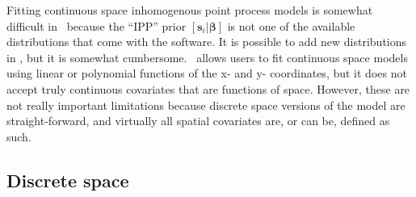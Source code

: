 Fitting continuous space inhomogenous point process models is somewhat
difficult in \bugs~because the ``IPP'' prior $[\mathbf{s}_i | \bm
\beta]$ is not one of the
available distributions that come with the software. It is
possible to add new distributions in \bugs, but it is somewhat
cumbersome.  \secr~allows
users to fit continuous space models using linear or polynomial functions of the x- and y-
coordinates, but it does not accept truly continuous covariates that
are functions of space. However, these
are not really important limitations because discrete
space versions of the model are straight-forward, and virtually all spatial
covariates are, or can be, defined as such.

\subsection{Discrete space}
\label{modeling.sec.discrete}

